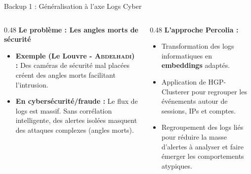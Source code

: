 \documentclass[A4,svgnames,9pt,aspectratio=169]{beamer}
\begin{document}
\begin{frame}{Backup 1 : Généralisation à l'axe Logs Cyber}
    \begin{columns}[T]
        \begin{column}{0.48\textwidth}
            \textbf{\bleu Le problème : Les angles morts de sécurité}
            \begin{itemize}
                \item \textbf{Exemple (Le Louvre - \textsc{Abdelhadi}) :} Des caméras de sécurité mal placées créent des angles morts facilitant l'intrusion.
                \item \textbf{En cybersécurité/fraude :} Le flux de logs est massif. Sans corrélation intelligente, des alertes isolées masquent des attaques complexes (angles morts).
            \end{itemize}
        \end{column}
        
        \begin{column}{0.48\textwidth}
            \textbf{\bleu L'approche Percolia :}
            \begin{itemize}
                \item Transformation des logs informatiques en \textbf{embeddings} adaptés.
                \item Application de HGP-Clusterer pour regrouper les événements autour de sessions, IPs et comptes.
                \item Regroupement des logs liés pour réduire la masse d'alertes à analyser et faire émerger les comportements atypiques.
            \end{itemize}
        \end{column}
    \end{columns}
\end{frame}
\end{document}
